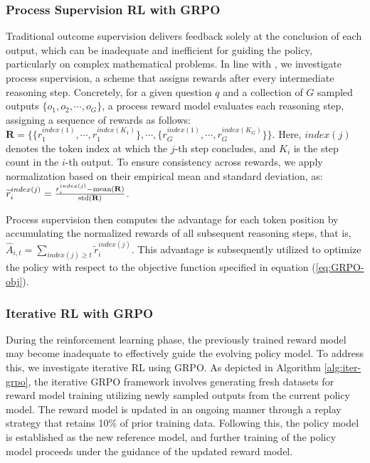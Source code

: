 \begin{itemize}[topsep=0pt]
\begin{itemize}[topsep=0pt]
\subsubsection{Process Supervision RL with GRPO} Traditional outcome supervision delivers feedback solely at the conclusion of each output, which can be inadequate and inefficient for guiding the policy, particularly on complex mathematical problems. In line with \cite{wang2023math}, we investigate process supervision, a scheme that assigns rewards after every intermediate reasoning step. Concretely, for a given question $q$ and a collection of $G$ sampled outputs $\{o_1, o_2, \cdots, o_G\}$, a process reward model evaluates each reasoning step, assigning a sequence of rewards as follows: $\mathbf{R} = \{ \{r_1^{index(1)},\cdots,r_1^{index(K_1)}\}, \cdots,  \{r_G^{index(1)},\cdots,r_G^{index(K_G)}\} \}$. Here, $index(j)$ denotes the token index at which the $j$-th step concludes, and $K_i$ is the step count in the $i$-th output. To ensure consistency across rewards, we apply normalization based on their empirical mean and standard deviation, as: $\widetilde{r}_i^{index(j)} = \frac{r_i^{index(j)} - {\rm mean(\mathbf{R})}}{{\rm std(\mathbf{R})}}$.

Process supervision then computes the advantage for each token position by accumulating the normalized rewards of all subsequent reasoning steps, that is, $\hat{A}_{i, t} = \sum_{index(j) \ge t} \widetilde{r}_i^{index(j)}$. This advantage is subsequently utilized to optimize the policy with respect to the objective function specified in equation (\ref{eq:GRPO-obj}).

\subsubsection{Iterative RL with GRPO} During the reinforcement learning phase, the previously trained reward model may become inadequate to effectively guide the evolving policy model. To address this, we investigate iterative RL using GRPO. As depicted in Algorithm \ref{alg:iter-grpo}, the iterative GRPO framework involves generating fresh datasets for reward model training utilizing newly sampled outputs from the current policy model. The reward model is updated in an ongoing manner through a replay strategy that retains 10\% of prior training data. Following this, the policy model is established as the new reference model, and further training of the policy model proceeds under the guidance of the updated reward model.


\end{itemize}
\end{itemize}
